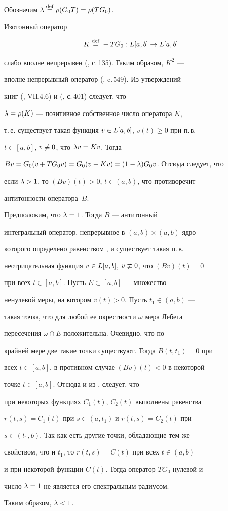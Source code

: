 \begin{pf}


Обозначим $\lambda\overset{\mathrm{def}}{=}{}\rho(G_0T)=\rho(TG_0)$.


Изотонный оператор


$$


K\eqdef-TG_0:\SL\to\SL


$$


слабо вполне непрерывен (\cite{Zab}, с.\,135).  Таким образом, $K^2$ ---


вполне непрерывный оператор (\cite{DSh}, c.\,549).  Из утверждений


книг (\cite{DSh}, VII.4.6) и (\cite{F}, с.\,401) следует, что


$\lambda=\rho(K)$ --- позитивное собственное число оператора $K$,


т.\,е. существует такая функция $v\in L[a,b]$, $v(t)\ge0$ при п.\,в.


$t\in[a,b]$, $v\not\equiv0$, что $\lambda v=Kv$.  Тогда


$Bv=G_0(v+TG_0v)=G_0(v-Kv)=(1-\lambda)G_0v$. Отсюда следует, что


если $\lambda>1$, то $(Bv)(t)>0$, $t\in(a,b)$, что противоречит


антитонности оператора~$B$.





Предположим, что $\lambda=1$.  Тогда  $B$ --- антитонный


интегральный оператор, непрерывное в $(a,b)\times(a,b)$ ядро


которого определено равенством , и существует такая п.\,в.


неотрицательная функция $v\in L[a,b]$, $v\not\equiv0$, что $(Bv)(t)=0$


при всех $t\in[a,b]$. Пусть $E\subset[a,b]$ --- множество


ненулевой меры, на котором $v(t)>0$. Пусть $t_1\in(a,b)$ ---


такая точка, что для любой ее окрестности $\omega$ мера Лебега


пересечения $\omega\cap E$ положительна. Очевидно, что по


крайней мере две такие точки существуют. Тогда $B(t,t_1)=0$ при


всех $t\in[a,b]$, в противном случае $(Bv)(t)<0$ в некоторой


точке $t\in[a,b]$. Отсюда и из ,  следует, что


при некоторых функциях $C_1(t)$, $C_2(t)$ выполнены равенства


$r(t,s)=C_1(t)$ при $s\in(a,t_1)$ и $r(t,s)=C_2(t)$ при


$s\in(t_1,b)$. Так как есть другие точки, обладающие тем же


свойством,  что и $t_1$, то $r(t,s)=C(t)$ при всех $t\in(a,b)$


и при некоторой функции $C(t)$. Тогда оператор $TG_0$ нулевой и


число $\lambda=1$ не является  его спектральным радиусом.


Таким образом, $\lambda<1$.


\end{pf}








